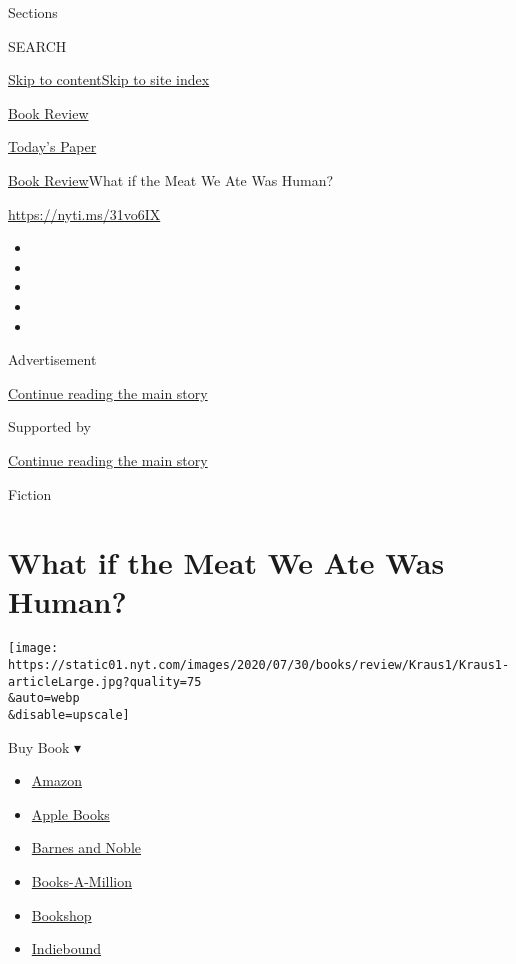 Sections

SEARCH

\protect\hyperlink{site-content}{Skip to
content}\protect\hyperlink{site-index}{Skip to site index}

\href{https://www.nytimes.com/section/books/review}{Book Review}

\href{https://myaccount.nytimes.com/auth/login?response_type=cookie\&client_id=vi}{}

\href{https://www.nytimes.com/section/todayspaper}{Today's Paper}

\href{/section/books/review}{Book Review}\textbar{}What if the Meat We
Ate Was Human?

\url{https://nyti.ms/31vo6IX}

\begin{itemize}
\item
\item
\item
\item
\item
\end{itemize}

Advertisement

\protect\hyperlink{after-top}{Continue reading the main story}

Supported by

\protect\hyperlink{after-sponsor}{Continue reading the main story}

Fiction

\hypertarget{what-if-the-meat-we-ate-was-human}{%
\section{What if the Meat We Ate Was
Human?}\label{what-if-the-meat-we-ate-was-human}}

\texttt{[image: https://static01.nyt.com/images/2020/07/30/books/review/Kraus1/Kraus1-articleLarge.jpg?quality=75\\\&auto=webp\\\&disable=upscale]}

Buy Book ▾

\begin{itemize}
\tightlist
\item
  \href{https://www.amazon.com/gp/search?index=books\&tag=NYTBSREV-20\&field-keywords=Tender+Is+the+Flesh+Agustina+Bazterrica}{Amazon}
\item
  \href{https://du-gae-books-dot-nyt-du-prd.appspot.com/buy?title=Tender+Is+the+Flesh\&author=Agustina+Bazterrica}{Apple
  Books}
\item
  \href{https://www.anrdoezrs.net/click-7990613-11819508?url=https\%3A\%2F\%2Fwww.barnesandnoble.com\%2Fw\%2F\%3Fean\%3D9781982150921}{Barnes
  and Noble}
\item
  \href{https://www.anrdoezrs.net/click-7990613-35140?url=https\%3A\%2F\%2Fwww.booksamillion.com\%2Fp\%2FTender\%2BIs\%2Bthe\%2BFlesh\%2FAgustina\%2BBazterrica\%2F9781982150921}{Books-A-Million}
\item
  \href{https://bookshop.org/a/3546/9781982150921}{Bookshop}
\item
  \href{https://www.indiebound.org/book/9781982150921?aff=NYT}{Indiebound}
\end{itemize}

